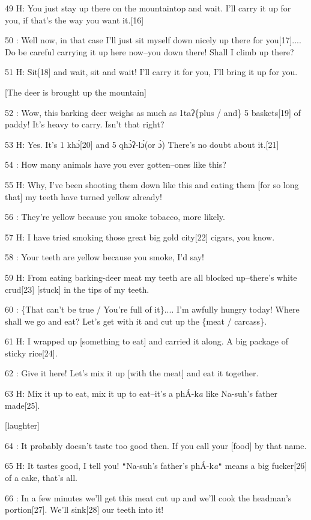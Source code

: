 49 H: You just stay up there on the mountaintop and wait. I'll carry it up for
you, if that's the way you want it.[16]

50  : Well now, in that case I'll just sit myself down nicely up there for you[17]....
Do be careful carrying it up here now--you down there! Shall I climb up there?

51 H: Sit[18] and wait, sit and wait! I'll carry it for you, I'll bring it up for
you.

[The deer is brought up the mountain]

52  : Wow, this barking  deer weighs as much as 1taʔ\{plus / and\} 5 baskets[19]
of paddy! It's heavy to carry. Isn't that right?

53 H: Yes. It's 1 khɔ́[20] and 5 qhɔ̀ʔ-lɔ́(or ɔ̀) There's no doubt about
it.[21]

54  : How many animals have you ever gotten--ones like this?

55 H: Why, I've been shooting them down like this and eating them [for so long
that] my teeth have turned yellow already!

56  : They're yellow because you smoke tobacco, more likely.

57 H: I have tried smoking those great big gold city[22] cigars, you know.

58  : Your teeth are yellow because you smoke, I'd say!

59 H: From eating barking-deer meat my teeth are all blocked up--there's white
crud[23] [stuck] in the tips of my teeth.

60  : \{That can't be true / You're full of it\}.... I'm awfully hungry today!
Where shall we go and eat? Let's get with it and cut up the \{meat / carcass\}.

61 H: I wrapped up [something to eat] and carried it along. A big package of sticky
rice[24].

62  : Give it here! Let's mix it up [with the meat] and eat it together.

63 H: Mix it up to eat, mix it up to eat--it's a phÁ-k\emph{a} like Na-suh's father
made[25].

[laughter]

64  : It probably doesn't taste too good then. If you call your [food] by that
name.

65 H: It tastes good, I tell you! \texttt{"}Na-suh's father's phÁ-k\emph{a}\texttt{"}
means a big fucker[26] of a cake, that's all.

66  : In a few minutes we'll get this meat cut up and we'll cook the headman's
portion[27]. We'll sink[28] our teeth into it!

